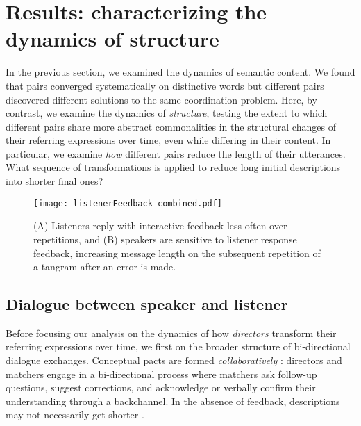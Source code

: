 \section{Results: characterizing the dynamics of structure}\label{results}

In the previous section, we examined the dynamics of semantic content.
We found that pairs converged systematically on distinctive words but different pairs discovered different solutions to the same coordination problem. 
Here, by contrast, we examine the dynamics of \emph{structure}, testing the extent to which different pairs share more abstract commonalities in the structural changes of their referring expressions over time, even while differing in their content. 
In particular, we examine \emph{how} different pairs reduce the length of their utterances.
What sequence of transformations is applied to reduce long initial descriptions into shorter final ones?

\begin{figure}[t]
\centering
\texttt{[image: listenerFeedback\_combined.pdf]}
\caption{(A) Listeners reply with interactive feedback less often over repetitions, and (B) speakers are sensitive to listener response feedback, increasing message length on the subsequent repetition of a tangram after an error is made.}
\label{fig:feedback}
\end{figure}

\subsection{Dialogue between speaker and listener}\label{listener-feedback}

Before focusing our analysis on the dynamics of how \emph{directors} transform their referring expressions over time, we first on the broader structure of bi-directional dialogue exchanges.
Conceptual pacts are formed \emph{collaboratively} \cite{ClarkWilkesGibbs86_ReferringCollaborative}: 
directors and matchers engage in a bi-directional process where matchers ask follow-up questions, suggest corrections, and acknowledge or verbally confirm their understanding through a backchannel. 
In the absence of feedback, descriptions may not necessarily get shorter \cite{KraussWeinheimer66_Tangrams, GarrodFayLeeOberlanderMacLeod07_GraphicalSymbolSystems}.

